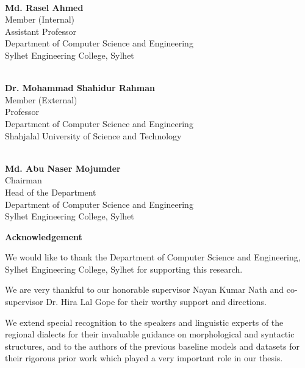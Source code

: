 \documentclass[12pt,a4paper]{article}
\begin{document}
\noindent
\begin{minipage}[t]{0.45\textwidth}
    \noindent\makebox[2.5in]{\hrulefill} \\
    \textbf{Md. Rasel Ahmed} \\
    Member (Internal) \\
    Assistant Professor \\
    Department of Computer Science and Engineering \\
    Sylhet Engineering College, Sylhet
\end{minipage}
\hfill
\begin{minipage}[t]{0.45\textwidth}
    \noindent\makebox[2.5in]{\hrulefill} \\
    \textbf{Dr. Mohammad Shahidur Rahman} \\
    Member (External) \\
    Professor \\
    Department of Computer Science and Engineering \\
    Shahjalal University of Science and Technology
\end{minipage}

\vspace{1.8cm}

\noindent
\begin{minipage}[t]{\textwidth}
    \centering
    \makebox[2.5in]{\hrulefill} \\
    \textbf{Md. Abu Naser Mojumder} \\
    Chairman \\
    Head of the Department \\
    Department of Computer Science and Engineering \\
    Sylhet Engineering College, Sylhet
\end{minipage}

\newpage
{}
\setcounter{page}{1}
\begin{center}
    \Large \textbf{Acknowledgement}
\end{center}
\vspace{1cm}

We would like to thank the Department of Computer Science and Engineering, Sylhet Engineering College, Sylhet for supporting this research.

We are very thankful to our honorable supervisor Nayan Kumar Nath and co-supervisor Dr. Hira Lal Gope for their worthy support and directions.

We extend special recognition to the speakers and linguistic experts of the regional dialects for their invaluable guidance on morphological and syntactic structures, and to the authors of the previous baseline models and datasets for their rigorous prior work which played a very important role in our thesis.
\end{document}
